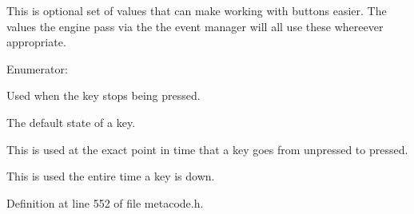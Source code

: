 This is optional set of values that can make working with buttons easier. The values the engine pass via the the event manager will all use these whereever appropriate. \begin{Desc}
\item[Enumerator: ]\par
\begin{description}
\item[{\em 
\hypertarget{classMezzanine_1_1MetaCode_a65b6d86ef846369bd8f3fd944a455fd0a07ca860b5b6b505052022d842f155080}{
BUTTON\_\-LIFTING}
\label{classMezzanine_1_1MetaCode_a65b6d86ef846369bd8f3fd944a455fd0a07ca860b5b6b505052022d842f155080}
}]Used when the key stops being pressed. \item[{\em 
\hypertarget{classMezzanine_1_1MetaCode_a65b6d86ef846369bd8f3fd944a455fd0a100e16dc4d4e866189e42ab81398f6e9}{
BUTTON\_\-UP}
\label{classMezzanine_1_1MetaCode_a65b6d86ef846369bd8f3fd944a455fd0a100e16dc4d4e866189e42ab81398f6e9}
}]The default state of a key. \item[{\em 
\hypertarget{classMezzanine_1_1MetaCode_a65b6d86ef846369bd8f3fd944a455fd0a9150dbdf88f3013383a72366904cb749}{
BUTTON\_\-PRESSING}
\label{classMezzanine_1_1MetaCode_a65b6d86ef846369bd8f3fd944a455fd0a9150dbdf88f3013383a72366904cb749}
}]This is used at the exact point in time that a key goes from unpressed to pressed. \item[{\em 
\hypertarget{classMezzanine_1_1MetaCode_a65b6d86ef846369bd8f3fd944a455fd0af66afc958f5eb62b8b836897d062b62b}{
BUTTON\_\-DOWN}
\label{classMezzanine_1_1MetaCode_a65b6d86ef846369bd8f3fd944a455fd0af66afc958f5eb62b8b836897d062b62b}
}]This is used the entire time a key is down. \end{description}
\end{Desc}



Definition at line 552 of file metacode.h.

